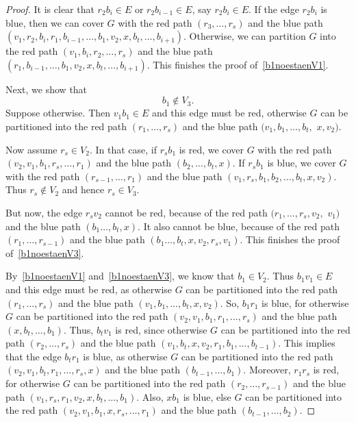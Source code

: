 \documentclass[a4paper,10pt]{article}
\begin{document}
\begin{proof}
It is clear that $r_2b_i \in E$ or $r_2b_{i-1} \in E$, say $r_2b_i \in E$.
If the edge $r_2b_i$ is blue, then we can cover $G$ with the red path $(r_3,\ldots,r_s)$ and the blue path $(v_1,r_2,b_i,r_1,b_{i-1},\ldots,b_1,v_2,x,b_t,\ldots,b_{i+1})$.
Otherwise, we can partition $G$ into the red path $(v_1,b_i,r_2,\ldots,r_s)$ and the blue path $(r_1,b_{i-1},\ldots,b_1,v_2,x,b_t,\ldots,b_{i+1})$. This finishes the proof of~\eqref{b1noestaenV1}.

\medskip

Next, we show that
\begin{equation}\label{b1noestaenV3}
 \text{$b_1 \notin V_3$.}
 \end{equation}
 Suppose otherwise. 
Then $v_1b_1 \in E$ and this edge must be red, otherwise $G$ can be partitioned into the red path $(r_1,\ldots,r_s)$ and the blue path $(v_1,b_1,\ldots,b_t,$ $x,v_2)$.
 
Now assume  $r_s\in V_2$. In that case, if $r_sb_1$ is red, we cover $G$ with the red path $(v_2,v_1,b_1,r_s,\ldots, r_1)$ and the blue path $(b_2,\ldots, b_t,x)$. If  $r_sb_1$ is blue, we cover $G$ with the red path $(r_{s-1},\ldots, r_1)$ and the blue path $(v_1,r_s,b_1,b_2,\ldots, b_t,x,v_2)$. 
Thus $r_s\notin V_2$ and hence $r_s\in V_3$.

But now, the edge $r_sv_2$ cannot be red, because of the red path $(r_1,\ldots, r_s,v_2,$ $v_1)$ and the blue path $(b_1\ldots, b_t,x)$. It also cannot be blue, because of the red path $(r_1,\ldots, r_{s-1})$ and the blue path $(b_1\ldots, b_t,x,v_2,r_s,v_1)$.
This finishes the proof of~\eqref{b1noestaenV3}.

\medskip

By~\eqref{b1noestaenV1} and~\eqref{b1noestaenV3}, we know that ${b_1 \in V_2}$.
Thus $b_1v_1 \in E$ and this edge must be red, as otherwise $G$ can be partitioned into the red path $(r_1,\ldots,r_s)$ and the blue path $(v_1,b_1,\ldots,b_t,x,v_2)$.
So, $b_1r_1$ is blue, for otherwise $G$ can be partitioned into the red path $(v_2,v_1,b_1,r_1,\ldots,r_s)$ and the blue path $(x,b_t,\ldots,b_1)$.
Thus, $b_tv_1$ is red, since otherwise $G$ can be partitioned into the red path $(r_2,\ldots,r_s)$ and the blue path $(v_1,b_t,x,v_2,r_1,b_1,\ldots,b_{t-1})$.
This implies that the edge $b_tr_1$ is blue, as otherwise $G$ can be partitioned into the red path $(v_2,v_1,b_t,r_1,\ldots,r_s,x)$ and the blue path $(b_{t-1},\ldots,b_1)$.
Moreover, $r_1r_s$ is red, for otherwise $G$ can be partitioned into the red path $(r_2,\ldots,r_{s-1})$ and the blue path $(v_1,r_s,r_1,v_2,x,b_t,\ldots,b_1)$.
Also, $xb_1$ is blue, else $G$ can be partitioned into the red path $(v_2,v_1,b_1,x,r_s,\ldots,r_1)$ and the blue path $(b_{t-1},\ldots,b_2)$.


\end{proof}
\end{document}

